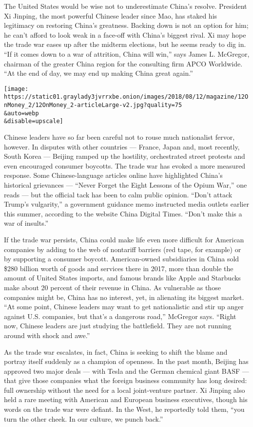 The United States would be wise not to underestimate China's resolve.
President Xi Jinping, the most powerful Chinese leader since Mao, has
staked his legitimacy on restoring China's greatness. Backing down is
not an option for him; he can't afford to look weak in a face-off with
China's biggest rival. Xi may hope the trade war eases up after the
midterm elections, but he seems ready to dig in. ``If it comes down to a
war of attrition, China will win,'' says James L. McGregor, chairman of
the greater China region for the consulting firm APCO Worldwide. ``At
the end of day, we may end up making China great again.''

\texttt{[image: https://static01.graylady3jvrrxbe.onion/images/2018/08/12/magazine/12OnMoney\_2/12OnMoney\_2-articleLarge-v2.jpg?quality=75\\\&auto=webp\\\&disable=upscale]}

Chinese leaders have so far been careful not to rouse much nationalist
fervor, however. In disputes with other countries --- France, Japan and,
most recently, South Korea --- Beijing ramped up the hostility,
orchestrated street protests and even encouraged consumer boycotts. The
trade war has evoked a more measured response. Some Chinese-language
articles online have highlighted China's historical grievances ---
``Never Forget the Eight Lessons of the Opium War,'' one reads --- but
the official tack has been to calm public opinion. ``Don't attack
Trump's vulgarity,'' a government guidance memo instructed media outlets
earlier this summer, according to the website China Digital Times.
``Don't make this a war of insults.''

If the trade war persists, China could make life even more difficult for
American companies by adding to the web of nontariff barriers (red tape,
for example) or by supporting a consumer boycott. American-owned
subsidiaries in China sold \$280 billion worth of goods and services
there in 2017, more than double the amount of United States imports, and
famous brands like Apple and Starbucks make about 20 percent of their
revenue in China. As vulnerable as those companies might be, China has
no interest, yet, in alienating its biggest market. ``At some point,
Chinese leaders may want to get nationalistic and stir up anger against
U.S. companies, but that's a dangerous road,'' McGregor says. ``Right
now, Chinese leaders are just studying the battlefield. They are not
running around with shock and awe.''

As the trade war escalates, in fact, China is seeking to shift the blame
and portray itself suddenly as a champion of openness. In the past
month, Beijing has approved two major deals --- with Tesla and the
German chemical giant BASF --- that give those companies what the
foreign business community has long desired: full ownership without the
need for a local joint-venture partner. Xi Jinping also held a rare
meeting with American and European business executives, though his words
on the trade war were defiant. In the West, he reportedly told them,
``you turn the other cheek. In our culture, we punch back.''

